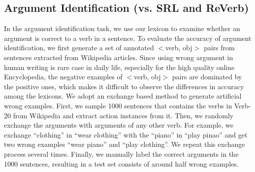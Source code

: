 \subsection{Argument Identification (vs. SRL and ReVerb)}
\iffalse Take another corpus and parse it with dependency parser, have human label the
correctness. We may need to artificially inject errors if there's not enough
incorrect action instances. Now use our lexicon, ReVerb and SRL to verify
the correctness and then compare the correlations with the human labels.

If a sentence contains logically or syntactically incorrect argument, then
the method is supposed to identify that.\fi

In the argument identification task, we use our lexicon to examine
whether an argument is correct to a verb in a sentence. To evaluate
the accuracy of argument identification, we first generate a set of
annotated $<$verb, obj$>$ pairs from sentences extracted from Wikipedia
articles. Since using wrong argument in human writing is rare case in daily life, especially
for the high quality online Encyclopedia, the
negative examples of $<$verb, obj$>$ pairs are dominated by the positive
ones, which makes it difficult to observe the differences in accuracy
among the lexicons. We adopt an exchange based method to generate artificial
wrong examples. First, we sample 1000 sentences that contains the verbs in
Verb-20 from Wikipedia and extract action instances from it. Then, we
randomly exchange the arguments with arguments of any other verb. For
example, we exchange ``clothing'' in ``wear clothing'' with the ``piano''
in ``play pinao'' and get two wrong examples ``wear piano'' and ``play clothing''.
We repeat this exchange process several times. Finally, we manually
label the correct arguments in the 1000 sentences, resulting in a test set
consists of around half wrong examples.



